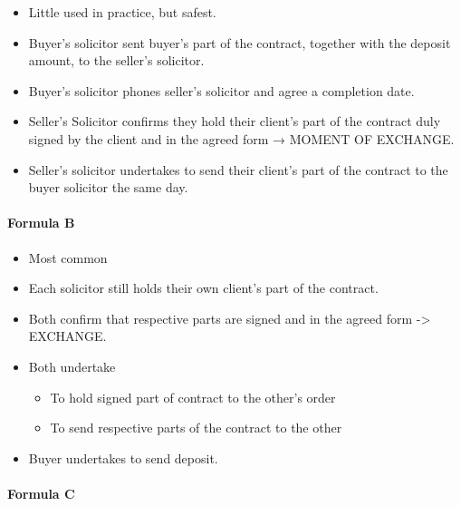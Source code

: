 \documentclass[
]{article}
\providecommand{\tightlist}{%
  \setlength{\itemsep}{0pt}\setlength{\parskip}{0pt}}
\begin{document}
\begin{itemize}
\tightlist
\item
  Little used in practice, but safest.
\item
  Buyer's solicitor sent buyer's part of the contract, together with the
  deposit amount, to the seller's solicitor.
\item
  Buyer's solicitor phones seller's solicitor and agree a completion
  date.
\item
  Seller's Solicitor confirms they hold their client's part of the
  contract duly signed by the client and in the agreed form → MOMENT OF
  EXCHANGE.
\item
  Seller's solicitor undertakes to send their client's part of the
  contract to the buyer solicitor the same day.
\end{itemize}

\hypertarget{formula-b}{%
\paragraph{Formula B}\label{formula-b}}

\begin{itemize}
\tightlist
\item
  Most common
\item
  Each solicitor still holds their own client's part of the contract.
\item
  Both confirm that respective parts are signed and in the agreed form
  -\textgreater{} EXCHANGE.
\item
  Both undertake

  \begin{itemize}
  \tightlist
  \item
    To hold signed part of contract to the other's order
  \item
    To send respective parts of the contract to the other
  \end{itemize}
\item
  Buyer undertakes to send deposit.
\end{itemize}

\hypertarget{formula-c}{%
\paragraph{Formula C}\label{formula-c}}
\end{document}
